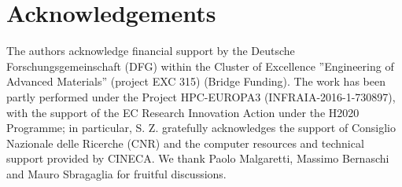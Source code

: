 \section{Acknowledgements}\label{sec:ack_two}
The authors acknowledge financial support by the Deutsche Forschungsgemeinschaft (DFG) within the Cluster of Excellence ''Engineering of Advanced Materials'' (project EXC 315) (Bridge Funding). 
The work has been partly performed under the Project HPC-EUROPA3 (INFRAIA-2016-1-730897), with the support of the EC Research Innovation Action under the H2020 Programme; in particular, S. Z. gratefully acknowledges the support of Consiglio Nazionale delle Ricerche (CNR) and the computer resources and technical support provided by CINECA.
We thank Paolo Malgaretti, Massimo Bernaschi and Mauro Sbragaglia for fruitful discussions.
